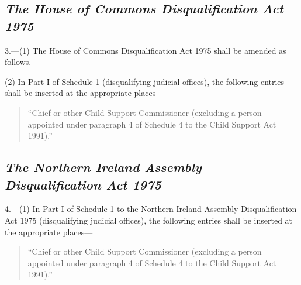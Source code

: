 \documentclass[12pt,a4paper]{article}
\begin{document}
%

\subsection*{\itshape The House of Commons Disqualification Act 1975}

3.---(1) The House of Commons Disqualification Act 1975 shall be amended as follows.

(2) In Part I 
of Schedule 1  %
(disqualifying judicial offices), the following entries shall be inserted at the appropriate places— 
\begin{quotation}
“Chief or other Child Support Commissioner (excluding a person appointed under paragraph 4 of Schedule 4 to the Child Support Act 1991).''
\end{quotation}



\subsection*{\itshape The Northern Ireland Assembly Disqualification Act 1975}

4.---(1) In Part I of 
Schedule 1 to  %
the Northern Ireland Assembly Disqualification Act 1975 (disqualifying judicial offices), the following entries shall be inserted at the appropriate places— 
\begin{quotation}
“Chief or other Child Support Commissioner (excluding a person appointed under paragraph 4 of Schedule 4 to the Child Support Act 1991).''
\end{quotation}
\end{document}
